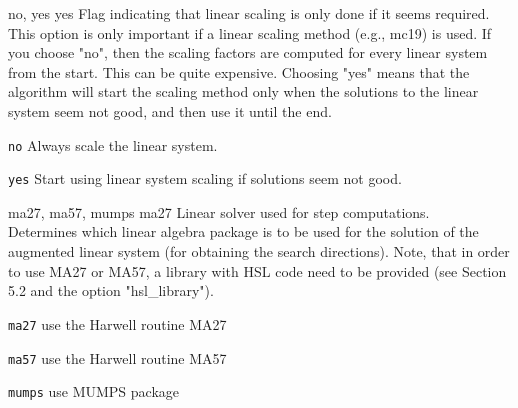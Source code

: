 %
{\ttfamily no, yes}%
{yes}%
{Flag indicating that linear scaling is only done if it seems required.\\
This option is only important if a linear scaling method (e.g., mc19) is used.  If you choose "no", then the scaling factors are computed for every linear system from the start.  This can be quite expensive. Choosing "yes" means that the algorithm will start the scaling method only when the solutions to the linear system seem not good, and then use it until the end.}%
{\begin{list}{}{
\setlength{\parsep}{0em}
\setlength{\leftmargin}{5ex}
\setlength{\labelwidth}{2ex}
\setlength{\itemindent}{0ex}
\setlength{\topsep}{0pt}}
\item[\texttt{no}] Always scale the linear system.
\item[\texttt{yes}] Start using linear system scaling if solutions seem not good.
\end{list}
}

%
{\ttfamily ma27, ma57, mumps}%
{ma27}%
{Linear solver used for step computations.\\
Determines which linear algebra package is to be used for the solution of the augmented linear system (for obtaining the search directions). Note, that in order to use MA27 or MA57, a library with HSL code need to be provided (see Section 5.2 and the option "hsl\_library").
}%
{\begin{list}{}{
\setlength{\parsep}{0em}
\setlength{\leftmargin}{5ex}
\setlength{\labelwidth}{2ex}
\setlength{\itemindent}{0ex}
\setlength{\topsep}{0pt}}
\item[\texttt{ma27}] use the Harwell routine MA27
\item[\texttt{ma57}] use the Harwell routine MA57
\item[\texttt{mumps}] use MUMPS package
\end{list}
}

